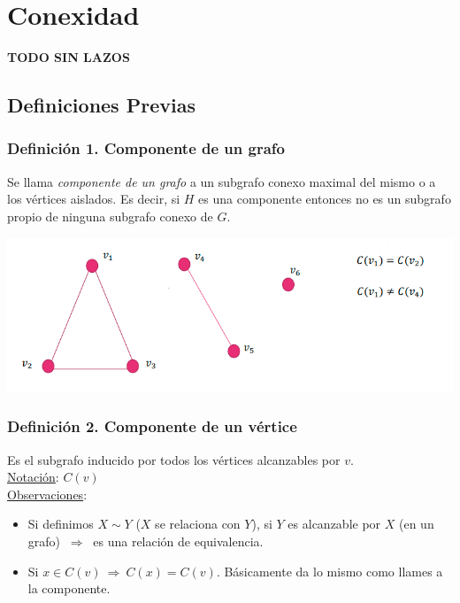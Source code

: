 \documentclass{article}
\newcommand{\Rightarrows}{\: \Rightarrow \:}            %
\newcommand{\bld}[1]{\textbf{#1}}
\begin{document}
\section{Conexidad}
\bld{TODO SIN LAZOS}
\subsection{Definiciones Previas}
\subsubsection*{Definición 1. Componente de un grafo}
Se llama \emph{componente de un grafo} a un subgrafo conexo maximal del mismo o a los vértices aislados.
Es decir, si $H$ es una componente entonces no es un subgrafo propio de ninguna subgrafo conexo de $G$.
\begin{center}
    \includegraphics[width=.60\textwidth]{componenteGrafo.PNG}
\end{center}

\subsubsection*{Definición 2. Componente de un vértice}
Es el subgrafo inducido por todos los vértices alcanzables por $v$.
\\\underline{Notación}: $C(v)$
\\\underline{Observaciones}:
\begin{itemize}
    \item Si definimos $X \sim Y$ ($X$ se relaciona con $Y$), si $Y$ es alcanzable por $X$ (en un grafo) $\Rightarrows$ es una relación de equivalencia.
    \item Si $x \in C(v) \Rightarrows C(x) = C(v)$. Básicamente da lo mismo como llames a la componente.
\end{itemize}
\end{document}
